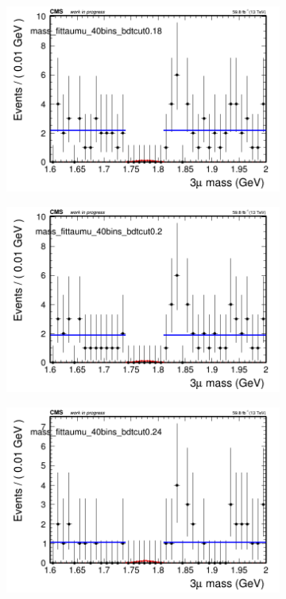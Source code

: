 \begin{figure}[H]
\begin{subfigure}{0.2\textwidth}
        \caption{}
    \end{subfigure}
    \begin{subfigure}{0.2\textwidth}
        \includegraphics[width=\textwidth]{flat_fit/plots/taumu/massfit_taumu_40bins_bdtcut0.18.png}
        \caption{}
    \end{subfigure}
    \begin{subfigure}{0.2\textwidth}
        \includegraphics[width=\textwidth]{flat_fit/plots/taumu/massfit_taumu_40bins_bdtcut0.2.png}
        \caption{}
    \end{subfigure}
    \begin{subfigure}{0.2\textwidth}
        \includegraphics[width=\textwidth]{flat_fit/plots/taumu/massfit_taumu_40bins_bdtcut0.24.png}

\end{subfigure}
\end{figure}
